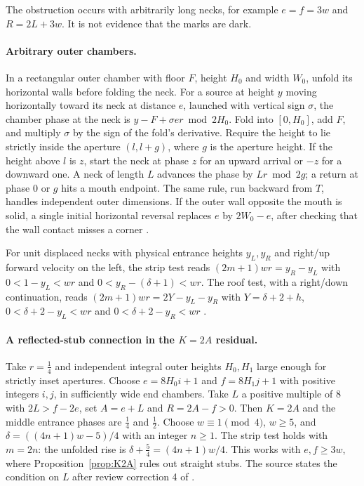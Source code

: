 \documentclass[11pt]{article}
\theoremstyle{definition}
\theoremstyle{remark}
\begin{document}
The obstruction occurs with arbitrarily long necks, for example $e=f=3w$ and
$R=2L+3w$. It is not evidence that the marks are dark.

\paragraph{Arbitrary outer chambers.} In a rectangular outer chamber with floor
$F$, height $H_0$ and width $W_0$, unfold its horizontal walls before folding the
neck. For a source at height $y$ moving horizontally toward its neck at distance
$e$, launched with vertical sign $\sigma$, the chamber phase at the neck is
$y-F+\sigma er\bmod 2H_0$. Fold into $[0,H_0]$, add $F$, and multiply $\sigma$ by
the sign of the fold's derivative. Require the height to lie strictly inside the
aperture $(l,l+g)$, where $g$ is the aperture height. If the height above $l$ is
$z$, start the neck at phase $z$ for an upward arrival or $-z$ for a downward one.
A neck of length $L$ advances the phase by $Lr\bmod 2g$; a return at phase $0$
or $g$ hits a mouth endpoint. The same rule, run backward from $T$, handles
independent outer dimensions. If the outer wall opposite the mouth is solid, a
single initial horizontal reversal replaces $e$ by $2W_0-e$, after checking that
the wall contact misses a corner \cite{R4}.

For unit displaced necks with physical entrance heights $y_L,y_R$ and right/up
forward velocity on the left, the strip test reads $(2m+1)wr=y_R-y_L$ with
$0<1-y_L<wr$ and $0<y_R-(\delta+1)<wr$. The roof test, with a right/down
continuation, reads $(2m+1)wr=2Y-y_L-y_R$ with $Y=\delta+2+h$,
$0<\delta+2-y_L<wr$ and $0<\delta+2-y_R<wr$ \cite{R4}.

\paragraph{A reflected-stub connection in the $K=2A$ residual.} Take
$r=\tfrac14$ and independent integral outer heights $H_0,H_1$ large enough for
strictly inset apertures. Choose $e=8H_0i+1$ and $f=8H_1j+1$ with positive
integers $i,j$, in sufficiently wide end chambers. Take $L$ a positive multiple
of $8$ with $2L>f-2e$, set $A=e+L$ and $R=2A-f>0$. Then $K=2A$ and the middle
entrance phases are $\tfrac14$ and $\tfrac12$. Choose $w\equiv 1\pmod 4$,
$w\ge 5$, and $\delta=((4n+1)w-5)/4$ with an integer $n\ge 1$. The strip test
holds with $m=2n$: the unfolded rise is $\delta+\tfrac54=(4n+1)w/4$. This works
with $e,f\ge 3w$, where Proposition~\ref{prop:K2A} rules out straight stubs.
The source states the condition on $L$ after review correction 4 of
\cite{d202}.
\end{document}
